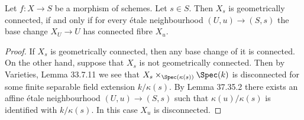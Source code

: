 \begin{lemma}[37.53.3]
Let $f:X\to S$ be a morphism of schemes. Let $s\in S$. Then $X_s$ is geometrically connected, if and only if for every \'etale neighbourhood $(U,u)\to(S,s)$ the base change $X_U\to U$ has connected fibre $X_u$.
\end{lemma}
\begin{proof}
If $X_s$ is geometrically connected, then any base change of it is connected. On the other hand, suppose that $X_s$ is not geometrically connected. Then by Varieties, Lemma 33.7.11 we see that $X_s\times_{\Spec(\kappa(s))}\Spec(k)$ is disconnected for some finite separable field extension $k/\kappa(s)$. By Lemma 37.35.2 there exists an affine \'etale neighbourhood $(U,u)\to(S,s)$ such that $\kappa(u)/\kappa(s)$ is identified with $k/\kappa(s)$. In this case $X_u$ is disconnected.
\end{proof}

